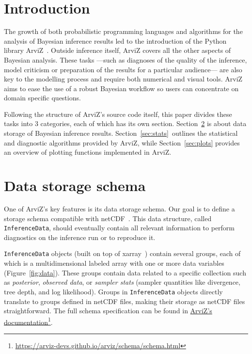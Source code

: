 \documentclass[anonymous=false, %
               format=acmsmall, %
               review=true, %
               screen=true, %
               nonacm=true]{acmart}
\begin{document}
\maketitle

\section{Introduction}
The growth of both probabilistic programming languages and algorithms for the
analysis of Bayesian inference results led to the introduction of the Python
library ArviZ~\cite{arviz2019}. Outside inference itself, ArviZ covers
all the other aspects of Bayesian analysis. These tasks ---such as diagnoses of
the quality of the inference, model criticism or preparation of the results
for a particular audience--- are also key to the modelling process and
require both numerical and visual tools. ArviZ aims to
ease the use of a robust
Bayesian workflow so users can concentrate on domain
specific questions.

Following the structure of ArviZ's source code itself, this
paper divides these tasks into 3 categories, each of which has its own
section. Section~\ref{sec:data} is about data storage of Bayesian inference
results.
Section~\ref{sec:stats}~outlines the statistical and diagnostic algorithms
provided by ArviZ, while Section~\ref{sec:plots} provides an overview of
plotting functions implemented in ArviZ.

\section{Data storage schema}\label{sec:data}
One of ArviZ's key features is its data storage schema. Our goal is to define
a storage schema compatible
with netCDF~\cite{unidata2011network}. This data structure, called
\texttt{InferenceData}, should eventually contain all
relevant information to perform diagnostics on the inference run or to reproduce
it.

\texttt{InferenceData} objects (built on
top of xarray~\cite{hoyer2017xarray}) contain several groups, each of which is
a multidimensional labeled array with one or more data variables
(Figure~\ref{fig:data}).
These groups contain data related to a specific collection such as \emph{posterior},
\emph{observed data}, or \emph{sampler stats} (sampler quantities like
divergence, tree depth, and log likelihood). Groups in \texttt{InferenceData}
objects directly translate to
groups defined in netCDF files, making their storage
as netCDF files straightforward. The full schema specification
can be found in \href{https://arviz-devs.github.io/arviz/schema/schema.html}{ArviZ's
documentation}\footnote{\url{https://arviz-devs.github.io/arviz/schema/schema.html}}.
\end{document}

